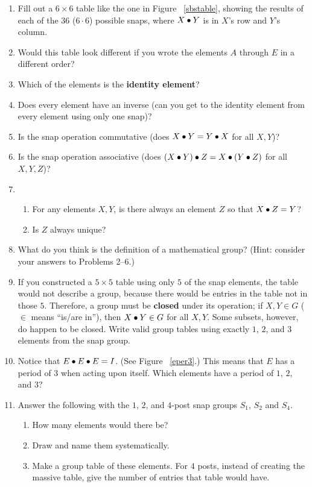 \documentclass[../gatm.tex]{subfiles}
\begin{document}
\begin{enumerate}
\item Fill out a $6\times 6$ table like the one in Figure ~\ref{sbstable}, showing the results of each of the $36$ ($6\cdot 6$) possible snaps, where $X\bullet Y$ is in $X$'s row and $Y$'s column.
\item Would this table look different if you wrote the elements $A$ through $E$ in a different order?
\item Which of the elements is the \textbf{identity element}?
\item Does every element have an inverse (can you get to the identity element from every element using only one snap)?
\item Is the snap operation commutative (does $X \bullet Y = Y \bullet X$ for all $X,Y$)?
\item Is the snap operation associative (does $(X \bullet Y) \bullet Z = X \bullet (Y\bullet Z)$ for all $X,Y,Z$)?
\item \begin{enumerate}
\item For any elements $X, Y$, is there always an element $Z$ so that $X\bullet Z=Y$?
\item Is $Z$ always unique?
\end{enumerate}
\item What do you think is the definition of a mathematical group? (Hint: consider your answers to Problems 2--6.)
\item If you constructed a $5\times 5$ table using only $5$ of the snap elements, the table would not describe a group, because there would be entries in the table not in those $5$. Therefore, a group must be \textbf{closed} under its operation; if $X,Y\in G$ ($\in$ means ``is/are in''), then $X\bullet Y\in G$ for all $X,Y$. Some subsets, however, do happen to be closed. Write valid group tables using exactly $1$, $2$, and $3$ elements from the snap group.
\item Notice that $E\bullet E\bullet E=I$. (See Figure ~\ref{eper3}.) This means that $E$ has a period of $3$ when acting upon itself. Which elements have a period of $1$, $2$, and $3$?
\item Answer the following with the $1$, $2$, and $4$-post snap groups $S_1$, $S_2$ and $S_4$.\begin{enumerate}
\item How many elements would there be?
\item Draw and name them systematically.
\item Make a group table of these elements. For $4$ posts, instead of creating the massive table, give the number of entries that table would have.

\end{enumerate}
\end{enumerate}
\end{document}
